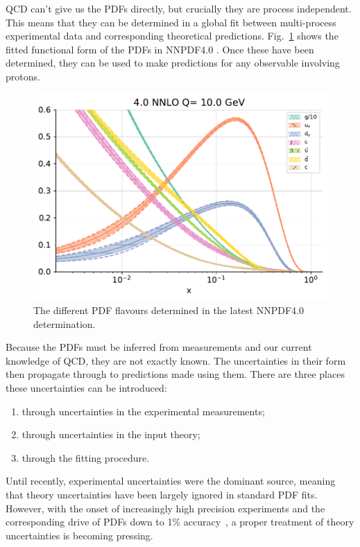 \documentclass[a4paper,12pt,oneside,openright]{book}
\numberwithin{equation}{section}
\numberwithin{figure}{section}
\numberwithin{table}{section}
\begin{document}
QCD can't give us the PDFs directly, but crucially they are process independent. This means that
they can be determined in a global fit between multi-process experimental data and corresponding
theoretical predictions.
Fig.~\ref{fig:pdfs} shows the fitted functional form of the PDFs in NNPDF4.0 \cite{Ball:2017nwa}. Once these have been determined, they can be used to make predictions for any observable involving protons.
\begin{figure}[h]
\centering
\includegraphics[width=\textwidth]{pdfflavourplot.pdf}
\caption{The different PDF flavours determined in the latest NNPDF4.0 determination. \label{fig:pdfs}}
\end{figure}

Because the PDFs must be inferred from measurements and our current knowledge of QCD, they are not exactly known. The uncertainties in their form then propagate through to predictions made using them. There are three
places these uncertainties can be introduced:
\begin{enumerate}
\item through uncertainties in the experimental measurements;
\item through uncertainties in the input theory;
\item through the fitting procedure.
\end{enumerate}
Until recently, experimental uncertainties were the dominant source, meaning that theory uncertainties have been largely ignored in standard PDF fits. However, with the onset of increasingly high precision experiments and the corresponding drive of PDFs down to 1\% accuracy~\cite{Cepeda:2019klc,Azzi:2019yne}, a proper treatment of theory uncertainties is becoming pressing. 
\end{document}
